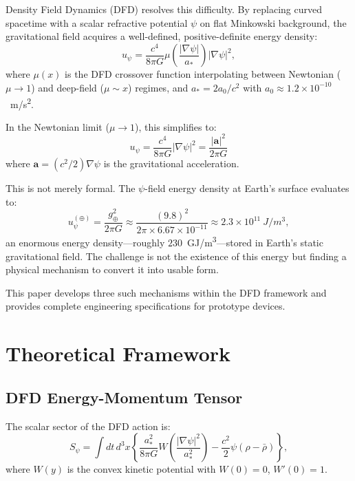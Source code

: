\documentclass[aps,prd,twocolumn,showpacs,preprintnumbers,superscriptaddress,nofootinbib]{revtex4-2}
\newcommand{\astar}{a_*}
\newcommand{\Wfunc}{W}
\newcommand{\mufunction}{\mu}
\begin{document}
Density Field Dynamics (DFD) resolves this difficulty.  By replacing curved
spacetime with a scalar refractive potential $\psi$ on flat Minkowski
background, the gravitational field acquires a well-defined, positive-definite
energy density:
\begin{equation}\label{eq:energy-density}
u_\psi = \frac{c^4}{8\pi G}\mufunction\!\left(\frac{|\nabla\psi|}{\astar}\right)|\nabla\psi|^2,
\end{equation}
where $\mufunction(x)$ is the DFD crossover function interpolating between
Newtonian ($\mu\to 1$) and deep-field ($\mu\sim x$) regimes, and
$\astar = 2a_0/c^2$ with $a_0 \approx 1.2\times 10^{-10}$~\si{m/s^2}.

In the Newtonian limit ($\mu\to 1$), this simplifies to:
\begin{equation}\label{eq:energy-density-newton}
\boxed{u_\psi = \frac{c^4}{8\pi G}|\nabla\psi|^2 = \frac{|\mathbf{a}|^2}{2\pi G}}
\end{equation}
where $\mathbf{a} = (c^2/2)\nabla\psi$ is the gravitational acceleration.

This is not merely formal.  The $\psi$-field energy density at Earth's surface
evaluates to:
\begin{equation}
u_\psi^{(\oplus)} = \frac{g_\oplus^2}{2\pi G} \approx \frac{(9.8)^2}{2\pi\times 6.67\times10^{-11}} \approx 2.3\times 10^{11}~\si{J/m^3},
\end{equation}
an enormous energy density---roughly $230$~\si{GJ/m^3}---stored in Earth's
static gravitational field.  The challenge is not the existence of this energy
but finding a physical mechanism to convert it into usable form.

This paper develops three such mechanisms within the DFD framework and provides
complete engineering specifications for prototype devices.

\section{Theoretical Framework}\label{sec:theory}

\subsection{DFD Energy-Momentum Tensor}\label{sec:emt}

The scalar sector of the DFD action is:
\begin{equation}\label{eq:action}
S_\psi = \int dt\,d^3x\left\{
  \frac{\astar^2}{8\pi G}\Wfunc\!\left(\frac{|\nabla\psi|^2}{\astar^2}\right)
  - \frac{c^2}{2}\psi(\rho-\bar{\rho})
\right\},
\end{equation}
where $\Wfunc(y)$ is the convex kinetic potential with $\Wfunc(0)=0$,
$\Wfunc'(0)=1$.
\end{document}
